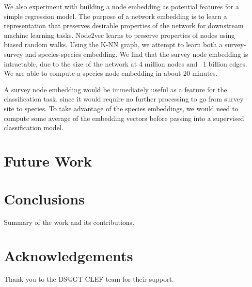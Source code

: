 \documentclass[]{style/ceurart}
\begin{document}
We also experiment with building a node embedding as potential features for a simple regression model. 
The purpose of a network embedding is to learn a representation that preserves desirable properties of the network for downstream machine learning tasks. 
Node2vec learns to preserve properties of nodes using biased random walks. 
Using the K-NN graph, we attempt to learn both a survey-survey and species-species embedding. 
We find that the survey node embedding is intractable, due to the size of the network at 4 million nodes and ~1 billion edges. 
We are able to compute a species node embedding in about 20 minutes.

A survey node embedding would be immediately useful as a feature for the classification task, since it would require no further processing to go from survey site to species. 
To take advantage of the species embeddings, we would need to compute some average of the embedding vectors before passing into a supervised classification model.


\section{Future Work}

\section{Conclusions}

Summary of the work and its contributions.

\section*{Acknowledgements}

Thank you to the DS@GT CLEF team for their support.



\end{document}
